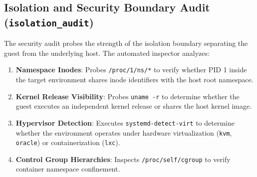 \subsection{Isolation and Security Boundary Audit (\texttt{isolation\_audit})}
\label{subsec:isolation_methodology}

The security audit probes the strength of the isolation boundary separating the guest from the underlying host. The automated inspector analyzes:
\begin{enumerate}
    \item \textbf{Namespace Inodes}: Probes \texttt{/proc/1/ns/*} to verify whether PID 1 inside the target environment shares inode identifiers with the host root namespace.
    \item \textbf{Kernel Release Visibility}: Probes \texttt{uname -r} to determine whether the guest executes an independent kernel release or shares the host kernel image.
    \item \textbf{Hypervisor Detection}: Executes \texttt{systemd-detect-virt} to determine whether the environment operates under hardware virtualization (\texttt{kvm}, \texttt{oracle}) or containerization (\texttt{lxc}).
    \item \textbf{Control Group Hierarchies}: Inspects \texttt{/proc/self/cgroup} to verify container namespace confinement.
\end{enumerate}
